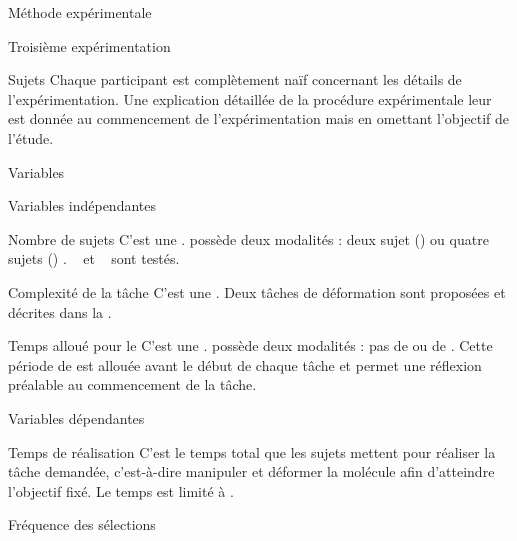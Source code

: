\documentclass[myfrancais,ngerman,english,french]{mythesis}
\begin{document}
\begin{mychapter}{Méthode expérimentale}
\begin{mysection}{Troisième expérimentation}
\begin{mysubsection}{Sujets}
				Chaque participant est complètement naïf concernant les détails de l'expérimentation.
				Une explication détaillée de la procédure expérimentale leur est donnée au commencement de l'expérimentation mais en omettant l'objectif de l'étude.
			\end{mysubsection}
			\begin{mysubsection}{Variables}
				\begin{mysubsubsection}{Variables indépendantes}
					\begin{myparagraph}{ Nombre de sujets}
						C'est une .
						 possède deux modalités : \og deux sujet (\mycf {}) \fg ou \og quatre sujets (\mycf {}) \fg.
						~ et ~ sont testés.
					\end{myparagraph}
					\begin{myparagraph}{ Complexité de la tâche}
						C'est une .
						Deux tâches de déformation sont proposées et décrites dans la .
					\end{myparagraph}
					\begin{myparagraph}{ Temps alloué pour le \mybrainstorming}
						C'est une .
						 possède deux modalités : \og pas de \mybrainstorming \fg ou \og {} de \mybrainstorming \fg.
						Cette période de \mybrainstorming est allouée avant le début de chaque tâche et permet une réflexion préalable au commencement de la tâche.
					\end{myparagraph}
				\end{mysubsubsection}
				\begin{mysubsubsection}{Variables dépendantes}
					\begin{myparagraph}{ Temps de réalisation}
						C'est le temps total que les sujets mettent pour réaliser la tâche demandée, c'est-à-dire manipuler et déformer la molécule afin d'atteindre l'objectif fixé.
						Le temps est limité à .
					\end{myparagraph}
					\begin{myparagraph}{ Fréquence des sélections}

\end{myparagraph}
\end{mysubsubsection}
\end{mysubsection}
\end{mysection}
\end{mychapter}
\end{document}
